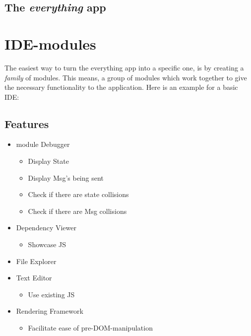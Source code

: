 \documentclass[runningheads]{llncs}
\begin{document}
\subsection{The \textit{everything} app}
\section {IDE-modules}
The easiest way to turn the everything app into a specific one, is by creating a
\textit{family} of modules. This means, a group of modules which work together
to give the necessary functionality to the application. Here is an example for a
basic IDE: %

\subsection{Features}

\begin{itemize}
  \item module Debugger
  \begin{itemize}
    \item Display State
    \item Display Msg's being sent
    \item Check if there are state collisions
    \item Check if there are Msg collisions
  \end{itemize}
  \item Dependency Viewer
  \begin{itemize}
    \item Showcase JS
  \end{itemize}
  \item File Explorer
  \item Text Editor
  \begin{itemize}
    \item Use existing JS
  \end{itemize}
  \item Rendering Framework
  \begin{itemize}
    \item Facilitate ease of pre-DOM-manipulation
  \end{itemize}
\end{itemize}
\end{document}
